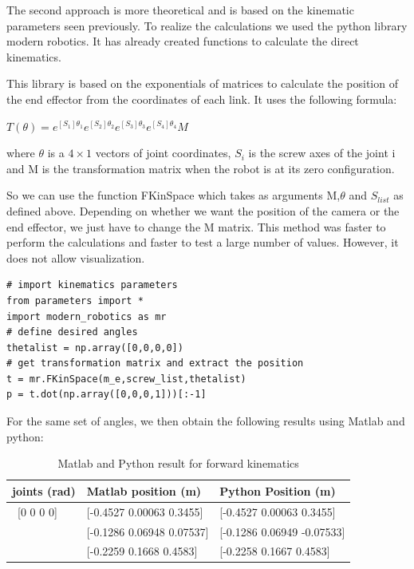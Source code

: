 \bigbreak
The second approach is more theoretical and is based on the kinematic parameters seen previously. To realize the calculations we used the python library modern robotics. It has already created functions to calculate the direct kinematics. 

\bigbreak
This library is based on the exponentials of matrices to calculate the position of the end effector from the coordinates of each link. It uses the following formula: 

\begin{center}
    $T(\theta) = e^{[S_1]\theta_1}e^{[S_2]\theta_2}e^{[S_3]\theta_3}e^{[S_4]\theta_4}M$    
\end{center}
where $\theta$ is a $4\times1$ vectors of joint coordinates, $S_i$ is the screw axes of the joint i and M is the transformation matrix when the robot is at its zero configuration.


\bigbreak
So we can use the function FKinSpace which takes as arguments M,$\theta$ and $S_{list}$ as defined above. Depending on whether we want the position of the camera or the end effector, we just have to change the M matrix. This method was faster to perform the calculations and faster to test a large number of values. However, it does not allow visualization.

\begin{verbatim}
# import kinematics parameters
from parameters import * 
import modern_robotics as mr
# define desired angles 
thetalist = np.array([0,0,0,0])
# get transformation matrix and extract the position
t = mr.FKinSpace(m_e,screw_list,thetalist)
p = t.dot(np.array([0,0,0,1]))[:-1]
\end{verbatim}

\bigbreak
For the same set of angles, we then obtain the following results using Matlab and python: 
\begin{table}[ht]
    \centering
    \begin{tabular}{|p{4cm} | p{4.5cm} | p{4.5cm}|} 
        \hline
        \textbf{joints (rad)} & \textbf{Matlab position (m)} & \textbf{Python Position (m)}\\ [0.3ex] 
        \hline\
        [0 0 0 0] & [-0.4527 0.00063 0.3455] & [-0.4527 0.00063 0.3455] \\ 
        \hline
        [pi/4,-pi/3,0,pi/3] & [-0.1286 0.06948 0.07537] & [-0.1286  0.06949 -0.07533] \\ 
        \hline
        [pi/4,pi/6,-pi/6,pi/3]& [-0.2259 0.1668 0.4583] & [-0.2258  0.1667  0.4583] \\ 
        \hline
    \end{tabular}
    \caption{Matlab and Python result for forward kinematics}
\end{table}

